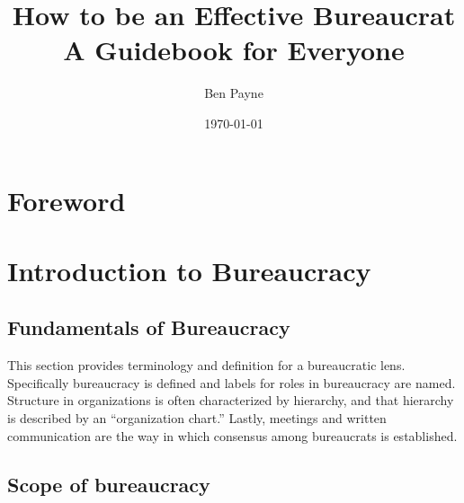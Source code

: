 \documentclass{book}
\title{How to be an Effective Bureaucrat\\
A Guidebook for Everyone}
\author{Ben Payne}
\date{\today}
\begin{document}
\begin{titlepage}
\maketitle
\thispagestyle{empty}
\end{titlepage}
\newpage

\frontmatter %

\clearpage

\chapter*{Foreword}%

\hypertarget{contents}{}
\tableofcontents

\mainmatter %

\chapter{Introduction to Bureaucracy}

  \section{Fundamentals of Bureaucracy\label{fundamentals_of_b}}
  This section provides terminology and definition for a bureaucratic lens. Specifically bureaucracy is defined and labels for roles in bureaucracy are named. Structure in organizations is often characterized by hierarchy, and that hierarchy is described by an ``organization chart.'' Lastly, meetings and written communication are the way in which consensus among bureaucrats is established.

    
    
    
    
    

  \section{Scope of bureaucracy}
    
\end{document}
